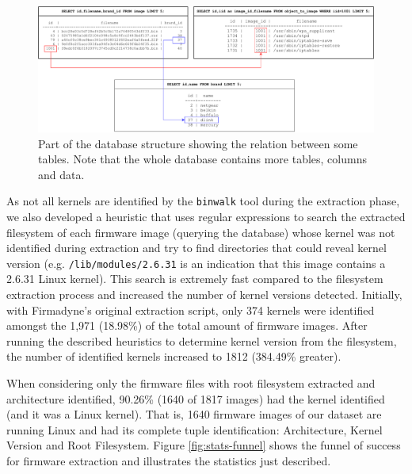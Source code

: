 \begin{figure}[H]
    \centering
    \includegraphics[width=1.0 \textwidth]{figs/SQL_Schema.pdf}
    \caption{Part of the database structure showing the relation between some tables. Note that the whole database contains more tables, columns and data.}
    \label{fig:sql-schema}
\end{figure}

As not all kernels are identified by the {\tt binwalk} tool during the extraction phase, we also developed a heuristic that uses regular expressions to search the extracted filesystem of each firmware image (querying the database) whose kernel was not identified during extraction and try to find directories that could reveal kernel version (e.g. {\tt /lib/modules/2.6.31} is an indication that this image contains a 2.6.31 Linux kernel). This search is extremely fast compared to the filesystem extraction process and increased the number of kernel versions detected. Initially, with Firmadyne's \cite{firmadyne} original extraction script, only 374 kernels were identified amongst the 1,971 (18.98\%) of the total amount of firmware images. After running the described heuristics to determine kernel version from the filesystem, the number of identified kernels increased to 1812 (384.49\% greater).

When considering only the firmware files with root filesystem extracted and architecture identified, 90.26\% (1640 of 1817 images) had the kernel identified (and it was a Linux kernel). That is, 1640 firmware images of our dataset are running Linux and had its complete tuple identification: Architecture, Kernel Version and Root Filesystem. Figure \ref{fig:stats-funnel} shows the funnel of success for firmware extraction and illustrates the statistics just described.

